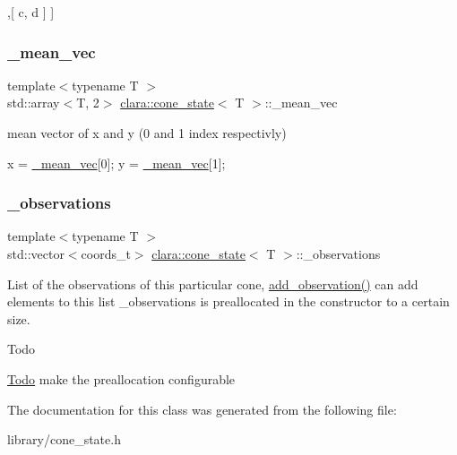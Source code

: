 \begin{DoxyCode}
[ [ a, b ]
 ,[ c, d ] ]
\end{DoxyCode}
 \mbox{\label{classclara_1_1cone__state_abf600e69be6a3791caefb93b214bb3b5}} 
\subsubsection{\texorpdfstring{\+\_\+mean\+\_\+vec}{\_mean\_vec}}
{\footnotesize\ttfamily template$<$typename T $>$ \\
std\+::array$<$T, 2$>$ \hyperlink{classclara_1_1cone__state}{clara\+::cone\+\_\+state}$<$ T $>$\+::\+\_\+mean\+\_\+vec\hspace{0.3cm}{\ttfamily [private]}}



mean vector of x and y (0 and 1 index respectivly) 


\begin{DoxyCode}
x = \hyperlink{classclara_1_1cone__state_abf600e69be6a3791caefb93b214bb3b5}{\_mean\_vec}[0];
y = \hyperlink{classclara_1_1cone__state_abf600e69be6a3791caefb93b214bb3b5}{\_mean\_vec}[1];
\end{DoxyCode}
 \mbox{\label{classclara_1_1cone__state_ae5c8c1ba05533a80ab1874fb878888b9}} 
\subsubsection{\texorpdfstring{\+\_\+observations}{\_observations}}
{\footnotesize\ttfamily template$<$typename T $>$ \\
std\+::vector$<$coords\+\_\+t$>$ \hyperlink{classclara_1_1cone__state}{clara\+::cone\+\_\+state}$<$ T $>$\+::\+\_\+observations\hspace{0.3cm}{\ttfamily [private]}}



List of the observations of this particular cone, {\ttfamily \hyperlink{classclara_1_1cone__state_a7cd7364ca787c25b0ca333d0cb1c3081}{add\+\_\+observation()}} can add elements to this list {\ttfamily \+\_\+observations} is preallocated in the constructor to a certain size. 

\begin{DoxyRefDesc}{Todo}
\item[\hyperlink{todo__todo000006}{Todo}]make the preallocation configurable \end{DoxyRefDesc}


The documentation for this class was generated from the following file\+:\begin{DoxyCompactItemize}
\item 
library/cone\+\_\+state.\+h\end{DoxyCompactItemize}
